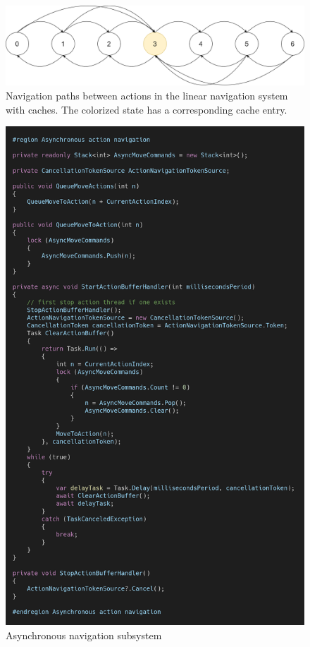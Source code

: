 \begin{figure}
\caption[Navigation paths in linear navigation system with caches]{Navigation paths between actions in the linear navigation system with caches. The colorized state has a corresponding cache entry.}
\label{fig:navsystem.cache.overview}
\centering
\includegraphics[width=\textwidth]{figures/navigationsystem-diagram/navigationsystem-cache-overview-2.png}
\end{figure}

\begin{figure}
\caption{Asynchronous navigation subsystem}
\label{fig:async.navigation}
\centering
\includegraphics[width=\textwidth]{figures/code/nav-arch/async-navigation.png}
\end{figure}


